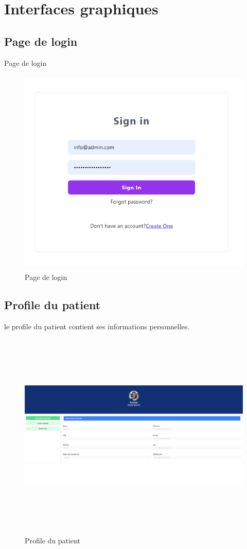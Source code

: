 \section{Interfaces graphiques}

\subsection{Page de login}

Page de login 

\begin{figure}[!h]
\begin{center}
\includegraphics[height=10cm]{log.png}
\end{center}
\caption{Page de login }
\end{figure}


\subsection{Profile du patient}

le profile du patient contient ses informations personnelles.

\begin{figure}[!h]
\centering
\begin{center}
\includegraphics[height=10cm,width=18cm]{gen.png}
\end{center}
\caption{Profile du patient}
\end{figure}


